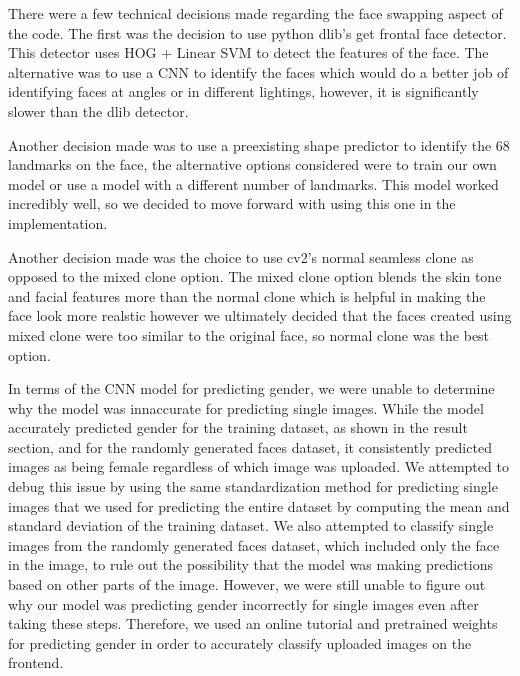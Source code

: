 
There were a few technical decisions made regarding the face swapping aspect of the code.
The first was the decision to use python dlib's get frontal face detector. This detector uses HOG + Linear SVM
to detect the features of the face. The alternative was to use a CNN to identify the faces which would do a better
job of identifying faces at angles or in different lightings, however, it is significantly slower than the dlib detector.

Another decision made was to use a preexisting shape predictor to identify the 68 landmarks on the face, the alternative options
considered were to train our own model or use a model with a different number of landmarks. This model worked incredibly well, so
we decided to move forward with using this one in the implementation.

Another decision made was the choice to use cv2's normal seamless clone as opposed to the mixed clone option. The mixed clone option
blends the skin tone and facial features more than the normal clone which is helpful in making the face look more realstic
however we ultimately decided that the faces created using mixed clone were too similar to the original face, so normal
clone was the best option.

In terms of the CNN model for predicting gender, we were unable to determine why the model was innaccurate for predicting single images. While
the model accurately predicted gender for the training dataset, as shown in the result section, and for the randomly generated faces dataset,
it consistently predicted images as being female regardless of which image was uploaded. We attempted to debug this issue by using the same standardization
method for predicting single images that we used for predicting the entire dataset by computing the mean and standard deviation of the training dataset. We also
attempted to classify single images from the randomly generated faces dataset, which included only the face in the image, to rule out the possibility that the model
was making predictions based on other parts of the image. However, we were still unable to figure out why our model was predicting gender incorrectly for single images
even after taking these steps. Therefore, we used an online tutorial and pretrained weights for predicting gender in order to accurately classify
uploaded images on the frontend.

